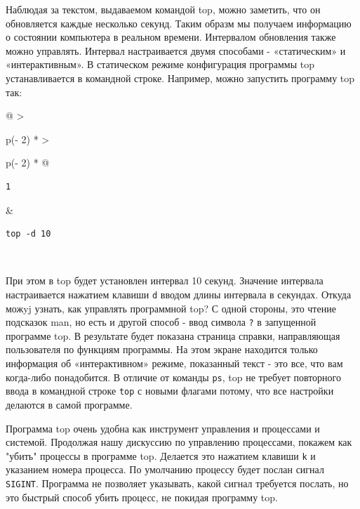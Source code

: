 \documentclass{article}
\begin{document}
Наблюдая за текстом, выдаваемом командой top, можно заметить, что он
обновляется каждые несколько секунд. Таким образм мы получаем информацию
о состоянии компьютера в реальном времени. Интервалом обновления также
можно управлять. Интервал настраивается двумя способами - «статическим»
и «интерактивным». В статическом режиме конфигурация программы top
устанавливается в командной строке. Например, можно запустить программу
top так:

\begin{longtable}[]{@{}
  >{\raggedright\arraybackslash}p{(\columnwidth - 2\tabcolsep) * }
  >{\raggedright\arraybackslash}p{(\columnwidth - 2\tabcolsep) * }@{}}
\toprule
\endhead
\begin{minipage}[t]{\linewidth}\raggedright
\begin{verbatim}
1
\end{verbatim}
\end{minipage} & \begin{minipage}[t]{\linewidth}\raggedright
\begin{verbatim}
top -d 10
\end{verbatim}
\end{minipage} \\ \addlinespace
\bottomrule
\end{longtable}

При этом в top будет установлен интервал 10 секунд. Значение интервала
настраивается нажатием клавиши \texttt{d} вводом длины интервала в
секундах. Откуда можyj узнать, как управлять программной top? С одной
стороны, это чтение подсказок man, но есть и другой способ - ввод
символа \texttt{?} в запущенной программе top. В результате будет
показана страница справки, направляющая пользователя по функциям
программы. На этом экране находится только информация об «интерактивном»
режиме, показанный текст - это все, что вам когда-либо понадобится. В
отличие от команды \texttt{ps}, top не требует повторного ввода в
командной строке \texttt{top} с новыми флагами потому, что все настройки
делаются в самой программе.

Программа top очень удобна как инструмент управления и процессами и
системой. Продолжая нашу дискуссию по управлению процессами, покажем как
"убить" процессы в программе top. Делается это нажатием клавиши
\texttt{k} и указанием номера процесса. По умолчанию процессу будет
послан сигнал \texttt{SIGINT}. Программа не позволяет указывать, какой
сигнал требуется послать, но это быстрый способ убить процесс, не
покидая программу top.
\end{document}
